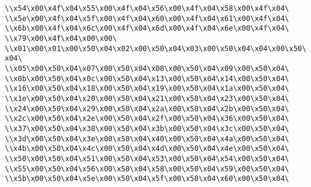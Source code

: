 \verb|\\x54\x00\x4f\x04\x55\x00\x4f\x04\x56\x00\x4f\x04\x58\x00\x4f\x04\|\newline
\verb|\\x5e\x00\x4f\x04\x5f\x00\x4f\x04\x60\x00\x4f\x04\x61\x00\x4f\x04\|\newline
\verb|\\x6b\x00\x4f\x04\x6c\x00\x4f\x04\x6d\x00\x4f\x04\x6e\x00\x4f\x04\|\newline
\verb|\\x79\x00\x4f\x04\x00\x00\|\newline
\verb|\\x01\x00\x01\x00\x50\x04\x02\x00\x50\x04\x03\x00\x50\x04\x04\x00\x50\x04\|\newline
\verb|\\x05\x00\x50\x04\x07\x00\x50\x04\x08\x00\x50\x04\x09\x00\x50\x04\|\newline
\verb|\\x0b\x00\x50\x04\x0c\x00\x50\x04\x13\x00\x50\x04\x14\x00\x50\x04\|\newline
\verb|\\x16\x00\x50\x04\x18\x00\x50\x04\x19\x00\x50\x04\x1a\x00\x50\x04\|\newline
\verb|\\x1e\x00\x50\x04\x20\x00\x50\x04\x21\x00\x50\x04\x23\x00\x50\x04\|\newline
\verb|\\x24\x00\x50\x04\x29\x00\x50\x04\x2a\x00\x50\x04\x2b\x00\x50\x04\|\newline
\verb|\\x2c\x00\x50\x04\x2e\x00\x50\x04\x2f\x00\x50\x04\x36\x00\x50\x04\|\newline
\verb|\\x37\x00\x50\x04\x38\x00\x50\x04\x3b\x00\x50\x04\x3c\x00\x50\x04\|\newline
\verb|\\x3d\x00\x50\x04\x3e\x00\x50\x04\x40\x00\x50\x04\x4a\x00\x50\x04\|\newline
\verb|\\x4b\x00\x50\x04\x4c\x00\x50\x04\x4d\x00\x50\x04\x4e\x00\x50\x04\|\newline
\verb|\\x50\x00\x50\x04\x51\x00\x50\x04\x53\x00\x50\x04\x54\x00\x50\x04\|\newline
\verb|\\x55\x00\x50\x04\x56\x00\x50\x04\x58\x00\x50\x04\x59\x00\x50\x04\|\newline
\verb|\\x5b\x00\x50\x04\x5e\x00\x50\x04\x5f\x00\x50\x04\x60\x00\x50\x04\|\newline
